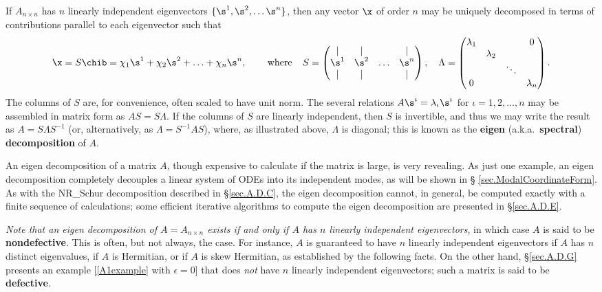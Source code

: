 If $A_{n\times n}$ has $n$ linearly independent eigenvectors
$\{\s^{1},\s^{2},\ldots \s^{n}\}$, then any vector $\x$ of order $n$
may be uniquely decomposed in terms of contributions parallel to each
eigenvector such that
\begin{equation*}
\x=S \chib = \chi_{1}\s^{1}+\chi_{2}\s^{2}+\ldots+\chi_{n}\s^{n}, \hskip0.3in \textrm{where} \hskip0.15in
S=\displaystyle \begin{pmatrix} | & | & & | \\ \s^1 & \s^2 & \ldots & \s^n \\  | & | & & | \end{pmatrix}, \quad
\Lambda=
       \begin{pmatrix} \lambda_1 &   &       & 0 \\
			 & \lambda_2 &       &   \\
			 &   &\ddots &   \\
		       0 &   &       & \lambda_n
		       \end{pmatrix}.
\end{equation*}
The columns of $S$ are, for convenience, often scaled to have unit
norm.  The several relations $A \s^\iota = \lambda_\iota \s^\iota$ for
$\iota = 1, 2, \ldots, n$ may be assembled in matrix form as $A S
= S \Lambda$.  If the columns of $S$ are linearly independent, then
$S$ is invertible, and thus we may write the result as $A = S \Lambda
S^{-1}$ (or, alternatively, as $\Lambda = S^{-1} A S$), where, as
illustrated above, $\Lambda$ is diagonal; this is known as the {\bf eigen} (a.k.a.~{\bf spectral}) {\bf decomposition} of $A$.  

An eigen decomposition of a matrix $A$,
though expensive to calculate if the matrix is large, is very revealing.
As just one example, an eigen decomposition completely decouples
a linear system of ODEs into its independent modes, as will be shown in \S
\ref{sec.ModalCoordinateForm}. As with the NR_Schur decomposition
described in \S \ref{sec.A.D.C}, the eigen decomposition cannot, in
general, be computed exactly with a finite sequence of calculations;
some efficient iterative algorithms to compute the eigen decomposition
are presented in \S \ref{sec.A.D.E}.

{\it Note that an eigen decomposition of $A=A_{n\times n}$
exists if and only if $A$ has $n$ linearly independent eigenvectors}, in which case $A$ is said to be {\bf nondefective}.
This is often, but not always, the case.  For instance, $A$ is
guaranteed to have $n$ linearly independent eigenvectors if $A$ has
$n$ distinct eigenvalues, if $A$ is Hermitian, or if $A$ is skew
Hermitian, as established by the following facts.  On the other hand,
\S \ref{sec.A.D.G} presents an example [\eqref{A1example} with
$\epsilon=0$] that does {\it not} have $n$ linearly independent
eigenvectors; such a matrix is said to be {\bf defective}.

